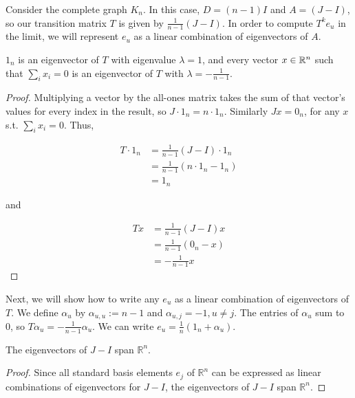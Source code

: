 Consider the complete graph $K_n$. In this case, $D = (n-1)I$ and $A = (J - I)$, so our transition
matrix $T$ is given by $\frac{1}{n-1}(J-I)$. In order to compute $T^ke_u$ in the limit, we will
represent $e_u$ as a linear combination of eigenvectors of $A$.

\begin{proposition}
  $1_n$ is an eigenvector of $T$ with eigenvalue $\lambda = 1$, and every
  vector $x \in \mathbb{R}^n$ such that $\sum_i x_i = 0$ is an eigenvector of $T$ with
  $\lambda = -\frac{1}{n-1}$.
\end{proposition}
\begin{proof}
  Multiplying a vector by the all-ones matrix takes the sum of that vector's
  values for every index in the result, so $J \cdot 1_n = n \cdot 1_n$.
  Similarly $Jx = 0_n$, for any $x$ s.t. $\sum_i x_i = 0$. Thus,

  \begin{align*}
    T\cdot 1_n &= \frac{1}{n-1}(J-I) \cdot 1_n \\
               &= \frac{1}{n-1}(n\cdot 1_n - 1_n) \\
               &= 1_n
  \end{align*}

  and

  \begin{align*}
    Tx &= \frac{1}{n-1}(J-I)x \\
       &= \frac{1}{n-1}(0_n - x) \\
       &= -\frac{1}{n-1}x
  \end{align*}
\end{proof}


Next, we will show how to write any $e_u$ as a linear combination of
eigenvectors of $T$. We define $\alpha_u$ by $\alpha_{u,u} := n-1$ and
$\alpha_{u,j} = -1, u\neq j$. The entries of $\alpha_u$ sum to $0$, so
$T\alpha_u=-\frac{1}{n-1}\alpha_u$. We can write
$e_u = \frac{1}{n}(1_n + \alpha_u)$.

\begin{corollary}
  The eigenvectors of $J-I$ span $\mathbb{R}^n$.
\end{corollary}
\begin{proof}
  Since all standard basis elements $e_j$ of $\mathbb{R}^n$ can be expressed as linear
  combinations of eigenvectors for $J-I$, the eigenvectors of $J-I$ span $\mathbb{R}^n$.
\end{proof}

